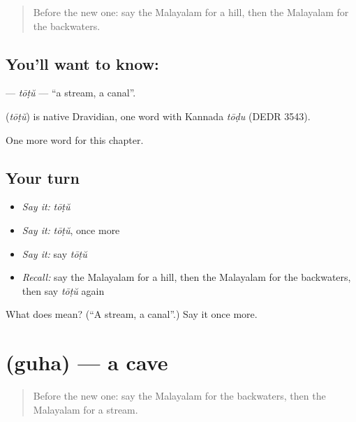\label{lesson:ML-C239-totu}



\begin{quote}
Before the new one: say the Malayalam for a hill, then the Malayalam for the backwaters.
\end{quote}

\subsection*{You'll want to know: }
\textbf{} — \emph{tōṭŭ} — \textquotedblleft{}a stream, a canal\textquotedblright{}.

\begin{cousinweb}
\textbf{} (\emph{tōṭŭ}) is native Dravidian, one word with Kannada \emph{tōḍu} (DEDR 3543).
\end{cousinweb}

\begin{grammarlens}[title={What you've built}]
One more word for this chapter.
\end{grammarlens}

\subsection*{Your turn}
\begin{itemize}
\raggedright
  \item \emph{Say it:} \emph{tōṭŭ}
  \item \emph{Say it:} \emph{tōṭŭ}, once more
  \item \emph{Say it:} say \emph{tōṭŭ}
  \item \emph{Recall:} say the Malayalam for a hill, then the Malayalam for the backwaters, then say \emph{tōṭŭ} again
\end{itemize}

\begin{tcolorbox}[breakable,colback=teal!4,colframe=teal!35!black,title={Before you move on}]
What does  mean? (\textquotedblleft{}A stream, a canal\textquotedblright{}.) Say it once more.
\end{tcolorbox}
\section[\texorpdfstring{\ml{ഗുഹ} (guha)}{ഗുഹ (guha)}]{ (guha) — a cave}

\label{lesson:ML-C239-guha}



\begin{quote}
Before the new one: say the Malayalam for the backwaters, then the Malayalam for a stream.
\end{quote}

